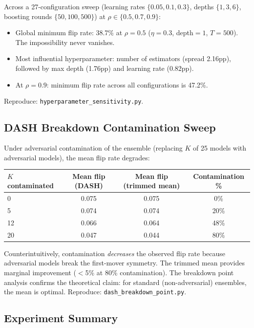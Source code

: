 \documentclass{article}
\begin{document}
Across a 27-configuration sweep (learning rates $\{0.05, 0.1, 0.3\}$, depths $\{1, 3, 6\}$, boosting rounds $\{50, 100, 500\}$) at $\rho \in \{0.5, 0.7, 0.9\}$:

\begin{itemize}
\item Global minimum flip rate: 38.7\% at $\rho{=}0.5$ ($\eta{=}0.3$, depth${=}1$, $T{=}500$). The impossibility never vanishes.
\item Most influential hyperparameter: number of estimators (spread 2.16pp), followed by max depth (1.76pp) and learning rate (0.82pp).
\item At $\rho{=}0.9$: minimum flip rate across all configurations is 47.2\%.
\end{itemize}

Reproduce: \texttt{hyperparameter\_sensitivity.py}.

\subsection{DASH Breakdown Contamination Sweep}
\label{sec:dash-contamination}

Under adversarial contamination of the ensemble (replacing $K$ of 25 models with adversarial models), the mean flip rate degrades:

\begin{center}
\small
\begin{tabular}{@{}lccc@{}}
\toprule
$K$ contaminated & Mean flip (DASH) & Mean flip (trimmed mean) & Contamination \% \\
\midrule
0  & 0.075 & 0.075 & 0\% \\
5  & 0.074 & 0.074 & 20\% \\
12 & 0.066 & 0.064 & 48\% \\
20 & 0.047 & 0.044 & 80\% \\
\bottomrule
\end{tabular}
\end{center}

Counterintuitively, contamination \emph{decreases} the observed flip rate because adversarial models break the first-mover symmetry. The trimmed mean provides marginal improvement ($<$5\% at 80\% contamination). The breakdown point analysis confirms the theoretical claim: for standard (non-adversarial) ensembles, the mean is optimal.
Reproduce: \texttt{dash\_breakdown\_point.py}.

\subsection{Experiment Summary}
\label{sec:experiment-summary}
\end{document}
